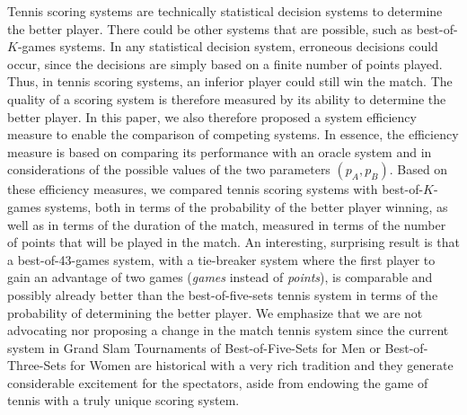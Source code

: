 \documentclass[11pt]{article}
\theoremstyle{plain}
\theoremstyle{definition}
\begin{document}
Tennis scoring systems are technically statistical decision systems to determine the better player. There could be other systems that are possible, such as best-of-$K$-games systems. In any statistical decision system, erroneous decisions could occur, since the decisions are simply based on a finite number of points played. Thus, in tennis scoring systems, an inferior player could still win the match. The quality of a scoring system is therefore measured by its ability to determine the better player. In this paper, we also therefore proposed a system efficiency measure to enable the comparison of competing systems. In essence, the efficiency measure is based on comparing its performance with an oracle system and in considerations of the possible values of the two parameters $(p_A,p_B)$. Based on these efficiency measures, we compared tennis scoring systems with best-of-$K$-games systems, both in terms of the probability of the better player winning, as well as in terms of the duration of the match, measured in terms of the number of points that will be played in the match. An interesting, surprising result is that a best-of-43-games system, with a tie-breaker system where the first player to gain an advantage of two games ({\em games} instead of {\em points}), is comparable and possibly already better than the best-of-five-sets tennis system in terms of the probability of determining the better player. We emphasize that we are not advocating nor proposing a change in the match tennis system since the current system in Grand Slam Tournaments of Best-of-Five-Sets for Men or Best-of-Three-Sets for Women are historical with a very rich tradition and they generate considerable excitement for the spectators, aside from endowing the game of tennis with a truly unique scoring system. 
\end{document}
